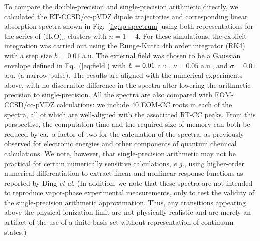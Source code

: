 To compare the double-precision and single-precision arithmetic directly, we
calculated the RT-CCSD/cc-pVDZ dipole trajectories and corresponding linear
absorption spectra shown in Fig.~\ref{fig:sp-spectrum} using both representations for the series of (H$_2$O)$_n$
clusters with $n=1-4$. For these simulations, the explicit integration was
carried out using the Runge-Kutta 4th order integrator (RK4) with a step size
$h=0.01$ a.u.  The external field was chosen to be a Gaussian envelope defined
in Eq.~(\ref{eq:field}) with ${\cal E} = 0.01$ a.u., $\nu=0.05$ a.u., and
$\sigma=0.01$ a.u. (a narrow pulse). The results are aligned with the numerical
experiments above, with no discernible difference in the spectra after lowering
the arithmetic precision to single-precision. All the spectra are also compared
with EOM-CCSD/cc-pVDZ calculations: we include 40 EOM-CC roots in each of the
spectra, all of which are well-aligned with the associated RT-CC peaks. From this perspective,
the computation time and the required size of memory can both be reduced by
ca.\ a factor of two for the calculation of the spectra, as previously observed
for electronic energies and other components of quantum chemical
calculations.\cite{Ufimtsev2008,Ufimtsev2008quantum,Asadchev2012,Tornai2019,Pokhilko2018}
We note, however, that single-precision arithmetic may not be practical for certain numerically sensitive calculations,
\textit{e.g.}, using higher-order numerical differentiation to extract linear and nonlinear response functions as reported
by Ding \textit{et al.}\cite{Ding2013}
(In addition, we note that these spectra are not intended to reproduce vapor-phase experimental
measurements, only to test the validity of the single-precision arithmetic
approximation.  Thus, any transitions appearing above the physical ionization
limit are not physically realistic and are merely an artifact of the use of a
finite basis set without representation of continuum states.)


